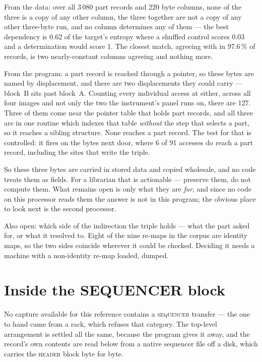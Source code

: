   From the data: over all 3\,080 part records and 220 byte columns, none of the three is a
  copy of any other column, the three together are not a copy of any other three-byte run,
  and no column determines any of them --- the best dependency is 0.62 of the target's
  entropy where a shuffled control scores 0.03 and a determination would score 1. The
  closest match,  agreeing with  in 97.6\,\% of records, is two
  nearly-constant columns agreeing and nothing more.

  From the program: a part record is reached through a pointer, so these bytes are named
  by displacement, and there are two displacements they could carry --- block~B sits
   past block~A. Counting every individual access at either, across all four
  images and not only the two the instrument's panel runs on, there are 127. Three of them
  come near the pointer table that holds part records, and all three are in one routine
  which indexes that table \emph{without} the step that selects a part, so it reaches a
  sibling structure. None reaches a part record. The test for that is controlled: it fires
  on the bytes next door, where 6 of 91 accesses do reach a part record, including the
  sites that write the triple.

  So these three bytes are carried in stored data and copied wholesale, and no code treats
  them as fields. For a librarian that is actionable --- preserve them, do not compute
  them. What remains open is only what they are \emph{for}, and since no code on this
  processor reads them the answer is not in this program; the obvious place to look next is
  the second processor.

  Also open: which side of the indirection the triple holds --- what the part asked for,
  or what it resolved to. Eight of the nine re-maps in the corpus are identity maps, so
  the two sides coincide wherever it could be checked. Deciding it needs a machine with a
  non-identity re-map loaded, dumped.

\section{Inside the SEQUENCER block}\label{sec:seqmemory}
No capture available for this reference contains a \textsc{sequencer} transfer --- the one
to hand came from a rack, which refuses that category. The top-level arrangement is
settled all the same, because the program gives it away, and the record's own contents
are read below from a native sequencer file off a disk, which carries the
\textsc{header} block byte for byte.

